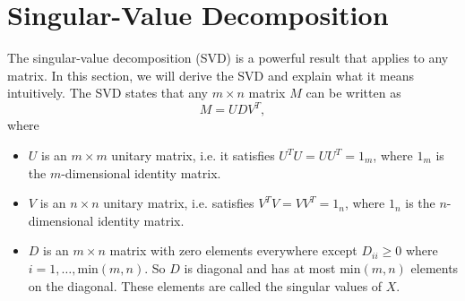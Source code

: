 \documentclass{article}
\theoremstyle{definition}
\begin{document}
\section{Singular-Value Decomposition}
\label{section:svd}
The singular-value decomposition (SVD) is a powerful result that applies to any matrix. In this section, we will derive the SVD and explain what it means intuitively. The SVD states that any $m\times n$ matrix $M$ can be written as
\begin{equation}
    M=UDV^T,
\end{equation}
where
\begin{itemize}
    \item $U$ is an $m\times m$ unitary matrix, i.e. it satisfies $U^TU=UU^T=1_m$, where $1_m$ is the $m$-dimensional identity matrix.
    \item $V$ is an $n\times n$ unitary matrix, i.e. satisfies $V^TV=VV^T=1_n$, where $1_n$ is the $n$-dimensional identity matrix.
    \item $D$ is an $m\times n$ matrix with zero elements everywhere except $D_{ii}\ge0$ where $i=1,\dots,\text{min}(m, n)$. So $D$ is diagonal and has at most $\text{min}(m, n)$ elements on the diagonal. These elements are called the singular values of $X$.
\end{itemize}
\end{document}

